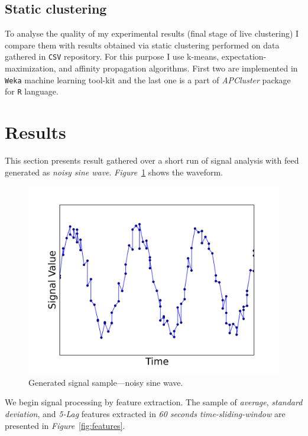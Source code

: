 \documentclass[11pt, letterpaper]{article}            %
\begin{document}
\subsection{Static clustering}
To analyse the quality of my experimental results (final stage of live clustering) I compare them with results obtained via static clustering performed on data gathered in \texttt{CSV} repository. For this purpose I use k-means, expectation-maximization, and affinity propagation algorithms. First two are implemented in \texttt{Weka} machine learning tool-kit and the last one is a part of \emph{APCluster} package for \texttt{R} language.


\section{Results}
This section presents result gathered over a short run of signal analysis with feed generated as \emph{noisy sine wave}. \emph{Figure}~\ref{fig:signal} shows the waveform.\\

\begin{figure}[htbp]
  \centering
  \includegraphics[width=.7\textwidth]{./gfx/feature5.png}
  \caption{Generated signal sample---noisy sine wave.\label{fig:signal}}
\end{figure}

We begin signal processing by feature extraction. The sample of \emph{average}, \emph{standard deviation}, and \emph{5-Lag} features extracted in \emph{60 seconds time-sliding-window} are presented in \emph{Figure}~\ref{fig:features}.\\
\end{document}
